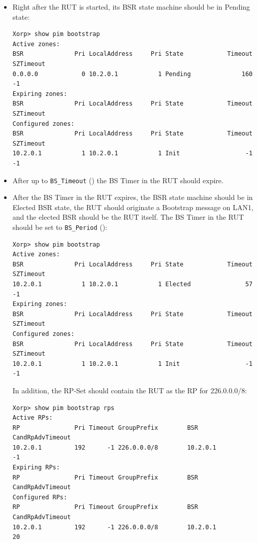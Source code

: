 \documentclass[11pt]{report}
\begin{document}
\begin{itemize}

  \item Right after the RUT is started, its BSR state machine should be in
  Pending state:

\begin{verbatim}
Xorp> show pim bootstrap 
Active zones:
BSR              Pri LocalAddress     Pri State            Timeout SZTimeout
0.0.0.0            0 10.2.0.1           1 Pending              160        -1
Expiring zones:
BSR              Pri LocalAddress     Pri State            Timeout SZTimeout
Configured zones:
BSR              Pri LocalAddress     Pri State            Timeout SZTimeout
10.2.0.1           1 10.2.0.1           1 Init                  -1        -1
\end{verbatim}

  \item After up to \verb=BS_Timeout= ({\PimsmBSTimeout}) the BS Timer
  in the RUT should expire.

  \item After the BS Timer in the RUT expires, the BSR state machine should be
  in Elected BSR state, the RUT should originate a Bootstrap message on LAN1,
  and the elected BSR should be the RUT itself.
  The BS Timer in the RUT should be set to \verb=BS_Period=
  ({\PimsmBSPeriod}):

\begin{verbatim}
Xorp> show pim bootstrap 
Active zones:
BSR              Pri LocalAddress     Pri State            Timeout SZTimeout
10.2.0.1           1 10.2.0.1           1 Elected               57        -1
Expiring zones:
BSR              Pri LocalAddress     Pri State            Timeout SZTimeout
Configured zones:
BSR              Pri LocalAddress     Pri State            Timeout SZTimeout
10.2.0.1           1 10.2.0.1           1 Init                  -1        -1
\end{verbatim}

  In addition, the RP-Set should contain the RUT as the RP for 226.0.0.0/8:

\begin{verbatim}
Xorp> show pim bootstrap rps 
Active RPs:
RP               Pri Timeout GroupPrefix        BSR         CandRpAdvTimeout
10.2.0.1         192      -1 226.0.0.0/8        10.2.0.1                  -1
Expiring RPs:
RP               Pri Timeout GroupPrefix        BSR         CandRpAdvTimeout
Configured RPs:
RP               Pri Timeout GroupPrefix        BSR         CandRpAdvTimeout
10.2.0.1         192      -1 226.0.0.0/8        10.2.0.1                  20
\end{verbatim}


\end{itemize}
\end{document}
